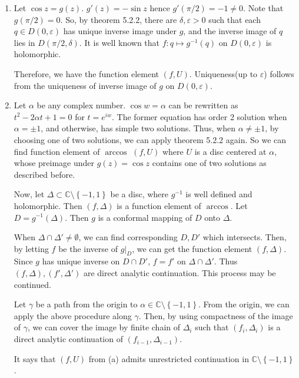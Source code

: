 \begin{problem}[10.1] \hfill
	\begin{enumerate}[label = (\alph*)]
		\item Let $\cos z = g(z)$. $g'(z) = -\sin z$ hence $g'(\pi/2) = -1 \ne 0$. Note that $g(\pi/2) = 0$.
			So, by theorem 5.2.2, there are $\delta, \varepsilon > 0$ such that each $q \in D(0, \varepsilon)$ has unique inverse image under $g$, and the inverse image of $q$ lies in $D(\pi/2, \delta)$.
			It is well known that $f: q \mapsto g^{-1}(q)$ on $D(0, \varepsilon)$ is holomorphic.
			
			Therefore, we have the function element $(f, U)$.
			Uniqueness(up to $\varepsilon$) follows from the uniqueness of inverse image of $g$ on $D(0, \varepsilon)$.

		\item Let $\alpha$ be any complex number.
			$\cos w = \alpha$ can be rewritten as $t^2 - 2\alpha t + 1 = 0$ for $t = e^{iw}$.
			The former equation has order 2 solution when $\alpha = \pm 1$, and otherwise, has simple two solutions.
			Thus, when $\alpha \ne \pm 1$, by choosing one of two solutions, we can apply theorem 5.2.2 again.
			So we can find function element of $\arccos$ $(f, U)$ where $U$ is a disc centered at $\alpha$, whose preimage under $g(z) = \cos z$ contains one of two solutions as described before.

			Now, let $\Delta \subset \mathbb{C} \setminus \left\{ -1, 1 \right\}$ be a disc, where $g^{-1}$ is well defined and holomorphic.
			Then $(f, \Delta)$ is a function element of $\arccos$.
			Let $D = g^{-1}(\Delta)$. Then $g$ is a conformal mapping of $D$ onto $\Delta$.

			When $\Delta \cap \Delta' \ne \emptyset$, we can find corresponding $D, D'$ which intersects. 
			Then, by letting $f$ be the inverse of $g|_{D}$, we can get the function element $(f, \Delta)$.
			Since $g$ has unique inverse on $D \cap D'$, $f = f'$ on $\Delta \cap \Delta'$.
			Thus $(f, \Delta), (f', \Delta')$ are direct analytic continuation.
			This process may be continued.

			Let $\gamma$ be a path from the origin to $\alpha \in \mathbb{C} \setminus \left\{ -1, 1 \right\}$.
			From the origin, we can apply the above procedure along $\gamma$.
			Then, by using compactness of the image of $\gamma$, we can cover the image by finite chain of $\Delta_i$ such that $(f_i, \Delta_i)$ is a direct analytic continuation of $(f_{i-1}, \Delta_{i-1})$.

			It says that $(f, U)$ from (a) admits unrestricted continuation in $\mathbb{C} \setminus\left\{ -1, 1 \right\}$.


\end{enumerate}
\end{problem}
